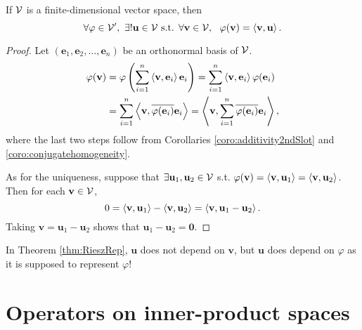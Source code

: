 \begin{thm}
  \label{thm:RieszRep}
  If ${\cal V}$ is a finite-dimensional vector space, 
  then
  \begin{equation}
    \label{eq:RieszRep}
    \forall \varphi\in {\cal V}',\ 
    \exists! \mathbf{u}\in {\cal V} \text{ s.t. }
    \forall \mathbf{v}\in {\cal V},\ \  \varphi(\mathbf{v}) = \innerProd{\mathbf{v},\mathbf{u}}.
  \end{equation}
\end{thm}
\begin{proof}
  Let $(\mathbf{e}_1,\mathbf{e}_2, \ldots, \mathbf{e}_n)$
  be an orthonormal basis of ${\cal V}$.
  \begin{align*}
    \varphi(\mathbf{v})
    &= \varphi\left(
      \sum_{i=1}^n\left\langle \mathbf{v}, \mathbf{e}_i \right\rangle \mathbf{e}_i\right)
      = \sum_{i=1}^n\left\langle \mathbf{v}, \mathbf{e}_i \right\rangle \varphi(\mathbf{e}_i)
    \\
    &=\sum_{i=1}^n\left\langle \mathbf{v}, \overline{\varphi(\mathbf{e}_i)}
      \mathbf{e}_i \right\rangle 
      =\left\langle \mathbf{v},  \sum_{i=1}^n\overline{\varphi(\mathbf{e}_i)}
      \mathbf{e}_i \right\rangle,
  \end{align*}
  where the last two steps follow from
  Corollaries \ref{coro:additivity2ndSlot}
  and \ref{coro:conjugatehomogeneity}.

  As for the uniqueness,
  suppose that $\exists \mathbf{u}_1, \mathbf{u}_2\in {\cal V}$
  s.t. $\varphi(\mathbf{v})=\left\langle \mathbf{v},\mathbf{u}_1 \right\rangle
  =\left\langle \mathbf{v},\mathbf{u}_2 \right\rangle$.
  Then for each $\mathbf{v}\in {\cal V}$,
  \begin{displaymath}
    0=\left\langle \mathbf{v},\mathbf{u}_1 \right\rangle-\left\langle \mathbf{v},\mathbf{u}_2 \right\rangle
    = \left\langle \mathbf{v},\mathbf{u}_1-\mathbf{u}_2 \right\rangle.
  \end{displaymath}
  Taking $\mathbf{v}=\mathbf{u}_1-\mathbf{u}_2$
  shows that $\mathbf{u}_1-\mathbf{u}_2=\mathbf{0}$.
\end{proof}

\begin{rem}
  In Theorem \ref{thm:RieszRep},
  $\mathbf{u}$ does not depend on $\mathbf{v}$, 
  but $\mathbf{u}$ does depend on $\varphi$
  as it is supposed to represent $\varphi$!
\end{rem}


\section{Operators on inner-product spaces}
\label{sec:oper-inner-prod}

